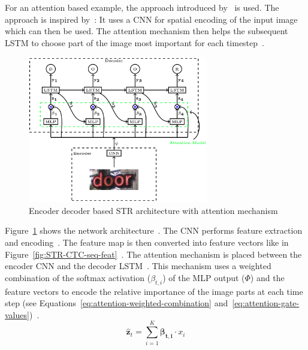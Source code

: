 For an attention based example, the approach introduced by~\cite{ghosh_visual_2017} is used.
The approach is inspired by~\cite{bahdanau_neural_2016,xu_show_2016}: It uses a \ac{CNN} for
spatial encoding of the input image which can then be used.
The attention mechanism then helps the subsequent \ac{LSTM} to choose part of the image most
important for each timestep~\citep{ghosh_visual_2017}.
\begin{figure}[h]
    \centering
    \includegraphics[width=0.7\textwidth]{img/STR-encdec-attention-Gosh-Visual-2017.png}
    \caption[Encoder decoder \& attention based STR architecture]{%
        Encoder decoder based STR architecture with attention
        mechanism~\citep{ghosh_visual_2017}\label{fig:STR-attention}
    }
\end{figure}
Figure~\ref{fig:STR-attention} shows the network architecture~\citep{ghosh_visual_2017}.
The \ac{CNN} performs feature extraction and encoding~\citep{ghosh_visual_2017}.
The feature map is then converted into feature vectors like in
Figure~\ref{fig:STR-CTC-seq-feat}~\citep{ghosh_visual_2017,shi_end--end_2017}.
The attention mechanism is placed between the encoder \ac{CNN} and the decoder
\ac{LSTM}~\citep{ghosh_visual_2017}.
This mechanism uses a weighted combination of the softmax activation ($\beta_{t,i}$) of the \ac{MLP}
output ($\Phi$) and the feature vectors to encode the relative importance of the image parts at
each time step (see Equations~\ref{eq:attention-weighted-combination}
and~\ref{eq:attention-gate-values})~\citep{ghosh_visual_2017,xu_show_2016}.
\begin{equation}\label{eq:attention-weighted-combination}
    \hat{\textbf{z}}_t=\sum_{i=1}^{K}\boldsymbol{\beta_{t,i}}\cdot x_i
\end{equation}

